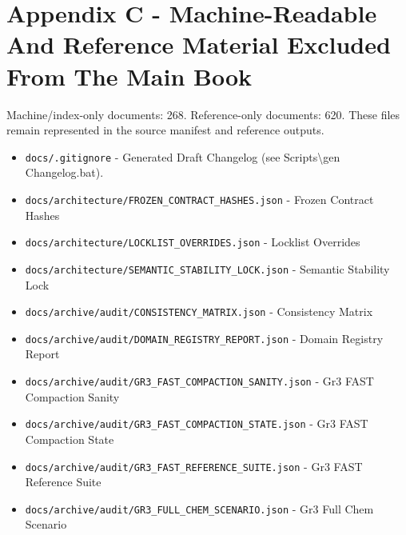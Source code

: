 \documentclass[10.5pt,a4paper,openany]{book}
\begin{document}
\section{Appendix C - Machine-Readable And Reference Material Excluded From The Main Book}

Machine/\allowbreak{}index-\allowbreak{}only documents: 268.\allowbreak{} Reference-\allowbreak{}only documents: 620.\allowbreak{} These files remain represented in the source manifest and reference outputs.\allowbreak{}


\begin{itemize}
\item \texttt{docs/\allowbreak{}.\allowbreak{}gitignore} -\allowbreak{} Generated Draft Changelog (see Scripts\textbackslash{}gen Changelog.\allowbreak{}bat).\allowbreak{}
\item \texttt{docs/\allowbreak{}architecture/\allowbreak{}FROZEN\_\allowbreak{}CONTRACT\_\allowbreak{}HASHES.\allowbreak{}json} -\allowbreak{} Frozen Contract Hashes
\item \texttt{docs/\allowbreak{}architecture/\allowbreak{}LOCKLIST\_\allowbreak{}OVERRIDES.\allowbreak{}json} -\allowbreak{} Locklist Overrides
\item \texttt{docs/\allowbreak{}architecture/\allowbreak{}SEMANTIC\_\allowbreak{}STABILITY\_\allowbreak{}LOCK.\allowbreak{}json} -\allowbreak{} Semantic Stability Lock
\item \texttt{docs/\allowbreak{}archive/\allowbreak{}audit/\allowbreak{}CONSISTENCY\_\allowbreak{}MATRIX.\allowbreak{}json} -\allowbreak{} Consistency Matrix
\item \texttt{docs/\allowbreak{}archive/\allowbreak{}audit/\allowbreak{}DOMAIN\_\allowbreak{}REGISTRY\_\allowbreak{}REPORT.\allowbreak{}json} -\allowbreak{} Domain Registry Report
\item \texttt{docs/\allowbreak{}archive/\allowbreak{}audit/\allowbreak{}GR3\_\allowbreak{}FAST\_\allowbreak{}COMPACTION\_\allowbreak{}SANITY.\allowbreak{}json} -\allowbreak{} Gr3 FAST Compaction Sanity
\item \texttt{docs/\allowbreak{}archive/\allowbreak{}audit/\allowbreak{}GR3\_\allowbreak{}FAST\_\allowbreak{}COMPACTION\_\allowbreak{}STATE.\allowbreak{}json} -\allowbreak{} Gr3 FAST Compaction State
\item \texttt{docs/\allowbreak{}archive/\allowbreak{}audit/\allowbreak{}GR3\_\allowbreak{}FAST\_\allowbreak{}REFERENCE\_\allowbreak{}SUITE.\allowbreak{}json} -\allowbreak{} Gr3 FAST Reference Suite
\item \texttt{docs/\allowbreak{}archive/\allowbreak{}audit/\allowbreak{}GR3\_\allowbreak{}FULL\_\allowbreak{}CHEM\_\allowbreak{}SCENARIO.\allowbreak{}json} -\allowbreak{} Gr3 Full Chem Scenario

\end{itemize}
\end{document}
